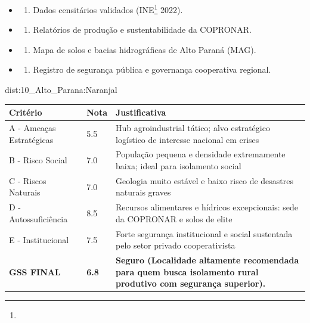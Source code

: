{\begin{itemize}
\tightlist
\item
  \begin{enumerate}
  \def\labelenumi{\arabic{enumi})}
  \tightlist
  \item
    Dados censitários validados (INE\footnote{\fineINE} 2022).
  \end{enumerate}
\item
  \begin{enumerate}
  \def\labelenumi{\arabic{enumi})}
  \setcounter{enumi}{1}
  \tightlist
  \item
    Relatórios de produção e sustentabilidade da COPRONAR.
  \end{enumerate}
\item
  \begin{enumerate}
  \def\labelenumi{\arabic{enumi})}
  \setcounter{enumi}{2}
  \tightlist
  \item
    Mapa de solos e bacias hidrográficas de Alto Paraná (MAG).
  \end{enumerate}
\item
  \begin{enumerate}
  \def\labelenumi{\arabic{enumi})}
  \setcounter{enumi}{3}
  \tightlist
  \item
    Registro de segurança pública e governança cooperativa regional.
  \end{enumerate}
\end{itemize}}{dist:10_Alto_Parana:Naranjal}
\begin{table}[ht!]
\small \begin{tabular}{p{3.0cm}p{0.8cm}p{6.0cm}} \toprule
\textbf{Critério} & \textbf{Nota} & \textbf{Justificativa} \\ \midrule
A - Ameaças Estratégicas & 5.5 & Hub agroindustrial tático; alvo estratégico logístico de interesse nacional em crises \\
B - Risco Social & 7.0 & População pequena e densidade extremamente baixa; ideal para isolamento social \\
C - Riscos Naturais & 7.0 & Geologia muito estável e baixo risco de desastres naturais graves \\
D - Autossuficiência & 8.5 & Recursos alimentares e hídricos excepcionais: sede da COPRONAR e solos de elite \\
E - Institucional & 7.5 & Forte segurança institucional e social sustentada pelo setor privado cooperativista \\
\midrule \textbf{GSS FINAL} & \textbf{6.8} & \textbf{Seguro (Localidade altamente recomendada para quem busca isolamento rural produtivo com segurança superior).} \\ \bottomrule \end{tabular}
\end{table}
